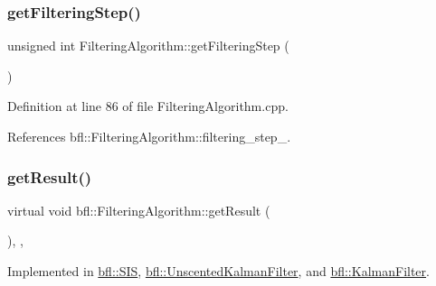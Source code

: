 \mbox{\label{classbfl_1_1FilteringAlgorithm_a8c43b1f3dac30934c0a03de348d4a29d}} 
\subsubsection{\texorpdfstring{get\+Filtering\+Step()}{getFilteringStep()}}
{\footnotesize\ttfamily unsigned int Filtering\+Algorithm\+::get\+Filtering\+Step (\begin{DoxyParamCaption}{ }\end{DoxyParamCaption})\hspace{0.3cm}{\ttfamily [inherited]}}



Definition at line 86 of file Filtering\+Algorithm.\+cpp.



References bfl\+::\+Filtering\+Algorithm\+::filtering\+\_\+step\+\_\+.

\mbox{\label{classbfl_1_1FilteringAlgorithm_acdfebf68405a427491e4dd9d020ae09b}} 
\subsubsection{\texorpdfstring{get\+Result()}{getResult()}}
{\footnotesize\ttfamily virtual void bfl\+::\+Filtering\+Algorithm\+::get\+Result (\begin{DoxyParamCaption}{ }\end{DoxyParamCaption})\hspace{0.3cm}{\ttfamily [protected]}, {}, {\ttfamily [inherited]}}



Implemented in \mbox{\hyperlink{classbfl_1_1SIS_a059da4c932379643ff7005fe4d0fda89}{bfl\+::\+S\+IS}}, \mbox{\hyperlink{classbfl_1_1UnscentedKalmanFilter_ad25c4f9143bbe834b3adfc81c78b6743}{bfl\+::\+Unscented\+Kalman\+Filter}}, and \mbox{\hyperlink{classbfl_1_1KalmanFilter_a24484fb845495f43628db19062937548}{bfl\+::\+Kalman\+Filter}}.

\mbox{\label{classbfl_1_1FilteringAlgorithm_af2a072aa51407fe5544bdbb7ce466e2a}} 
